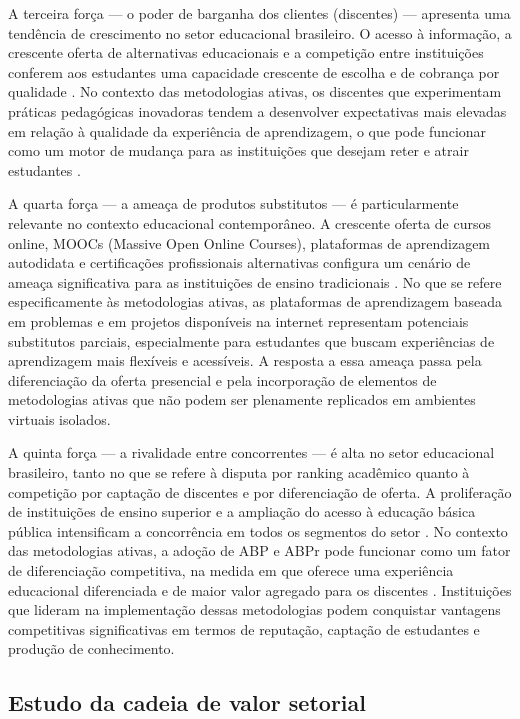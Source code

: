 A terceira força — o poder de barganha dos clientes (discentes) — apresenta uma tendência de crescimento no setor educacional brasileiro. O acesso à informação, a crescente oferta de alternativas educacionais e a competição entre instituições conferem aos estudantes uma capacidade crescente de escolha e de cobrança por qualidade \cite{MENEZES2020}. No contexto das metodologias ativas, os discentes que experimentam práticas pedagógicas inovadoras tendem a desenvolver expectativas mais elevadas em relação à qualidade da experiência de aprendizagem, o que pode funcionar como um motor de mudança para as instituições que desejam reter e atrair estudantes \cite{BACICH2018}.

A quarta força — a ameaça de produtos substitutos — é particularmente relevante no contexto educacional contemporâneo. A crescente oferta de cursos online, MOOCs (Massive Open Online Courses), plataformas de aprendizagem autodidata e certificações profissionais alternativas configura um cenário de ameaça significativa para as instituições de ensino tradicionais \cite{SELWYN2022}. No que se refere especificamente às metodologias ativas, as plataformas de aprendizagem baseada em problemas e em projetos disponíveis na internet representam potenciais substitutos parciais, especialmente para estudantes que buscam experiências de aprendizagem mais flexíveis e acessíveis. A resposta a essa ameaça passa pela diferenciação da oferta presencial e pela incorporação de elementos de metodologias ativas que não podem ser plenamente replicados em ambientes virtuais isolados.

A quinta força — a rivalidade entre concorrentes — é alta no setor educacional brasileiro, tanto no que se refere à disputa por ranking acadêmico quanto à competição por captação de discentes e por diferenciação de oferta. A proliferação de instituições de ensino superior e a ampliação do acesso à educação básica pública intensificam a concorrência em todos os segmentos do setor \cite{PORTER1980}. No contexto das metodologias ativas, a adoção de ABP e ABPr pode funcionar como um fator de diferenciação competitiva, na medida em que oferece uma experiência educacional diferenciada e de maior valor agregado para os discentes \cite{BACICH2018}. Instituições que lideram na implementação dessas metodologias podem conquistar vantagens competitivas significativas em termos de reputação, captação de estudantes e produção de conhecimento.

\subsection{Estudo da cadeia de valor setorial}
\label{subsec:cadeia_valor}

